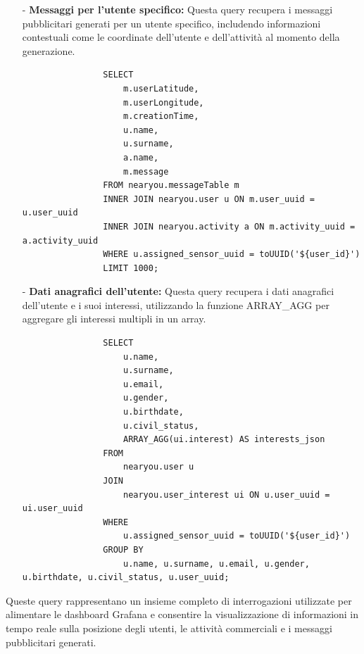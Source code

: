 \documentclass[10pt]{article}
\begin{document}
\begin{itemize}
\begin{itemize}
                \item[-] \textbf{Messaggi per l'utente specifico:}
                Questa query recupera i messaggi pubblicitari generati per un utente specifico, includendo informazioni contestuali come le coordinate dell'utente e dell'attività al momento della generazione.
                
                \begin{lstlisting}
                SELECT     
                    m.userLatitude, 
                    m.userLongitude, 
                    m.creationTime, 
                    u.name, 
                    u.surname, 
                    a.name, 
                    m.message 
                FROM nearyou.messageTable m
                INNER JOIN nearyou.user u ON m.user_uuid = u.user_uuid 
                INNER JOIN nearyou.activity a ON m.activity_uuid = a.activity_uuid 
                WHERE u.assigned_sensor_uuid = toUUID('${user_id}')
                LIMIT 1000;
                \end{lstlisting}
                
                \item[-] \textbf{Dati anagrafici dell'utente:}
                Questa query recupera i dati anagrafici dell'utente e i suoi interessi, utilizzando la funzione ARRAY\_AGG per aggregare gli interessi multipli in un array.
                
                \begin{lstlisting}
                SELECT 
                    u.name, 
                    u.surname, 
                    u.email, 
                    u.gender, 
                    u.birthdate, 
                    u.civil_status, 
                    ARRAY_AGG(ui.interest) AS interests_json
                FROM 
                    nearyou.user u
                JOIN 
                    nearyou.user_interest ui ON u.user_uuid = ui.user_uuid
                WHERE 
                    u.assigned_sensor_uuid = toUUID('${user_id}')
                GROUP BY 
                    u.name, u.surname, u.email, u.gender, u.birthdate, u.civil_status, u.user_uuid;
                \end{lstlisting}
            \end{itemize}
        \end{itemize}
        Queste query rappresentano un insieme completo di interrogazioni utilizzate per alimentare le dashboard Grafana e consentire la visualizzazione di informazioni in tempo reale sulla posizione degli utenti, le attività commerciali e i messaggi pubblicitari generati.
\end{document}
